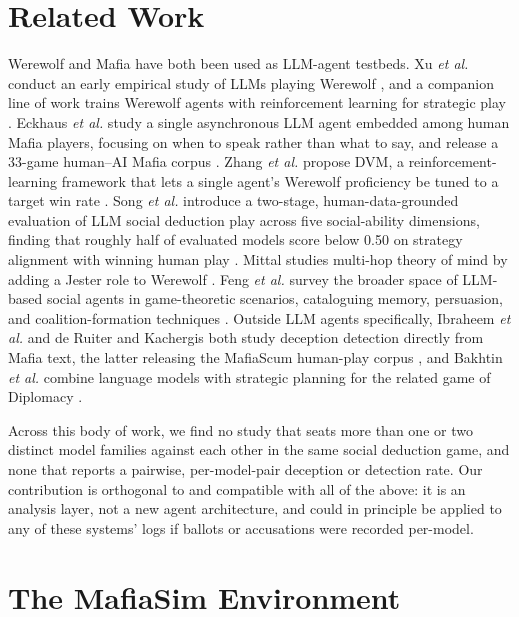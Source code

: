 \documentclass[10pt,conference]{IEEEtran}
\begin{document}
\section{Related Work}

Werewolf and Mafia have both been used as LLM-agent testbeds. Xu \textit{et al.} conduct an early empirical study of LLMs playing Werewolf \cite{xu2023exploring}, and a companion line of work trains Werewolf agents with reinforcement learning for strategic play \cite{xu2024language}. Eckhaus \textit{et al.} study a single asynchronous LLM agent embedded among human Mafia players, focusing on when to speak rather than what to say, and release a 33-game human--AI Mafia corpus \cite{eckhaus2025time}. Zhang \textit{et al.} propose DVM, a reinforcement-learning framework that lets a single agent's Werewolf proficiency be tuned to a target win rate \cite{zhang2025dvm}. Song \textit{et al.} introduce a two-stage, human-data-grounded evaluation of LLM social deduction play across five social-ability dimensions, finding that roughly half of evaluated models score below 0.50 on strategy alignment with winning human play \cite{song2025beyond}. Mittal studies multi-hop theory of mind by adding a Jester role to Werewolf \cite{mittal2026triadic}. Feng \textit{et al.} survey the broader space of LLM-based social agents in game-theoretic scenarios, cataloguing memory, persuasion, and coalition-formation techniques \cite{feng2024survey}. Outside LLM agents specifically, Ibraheem \textit{et al.} and de Ruiter and Kachergis both study deception detection directly from Mafia text, the latter releasing the MafiaScum human-play corpus \cite{ibraheem2022putting,deruiter2018mafiascum}, and Bakhtin \textit{et al.} combine language models with strategic planning for the related game of Diplomacy \cite{bakhtin2022human}.

Across this body of work, we find no study that seats more than one or two distinct model families against each other in the same social deduction game, and none that reports a pairwise, per-model-pair deception or detection rate. Our contribution is orthogonal to and compatible with all of the above: it is an analysis layer, not a new agent architecture, and could in principle be applied to any of these systems' logs if ballots or accusations were recorded per-model.

\section{The MafiaSim Environment}
\end{document}
